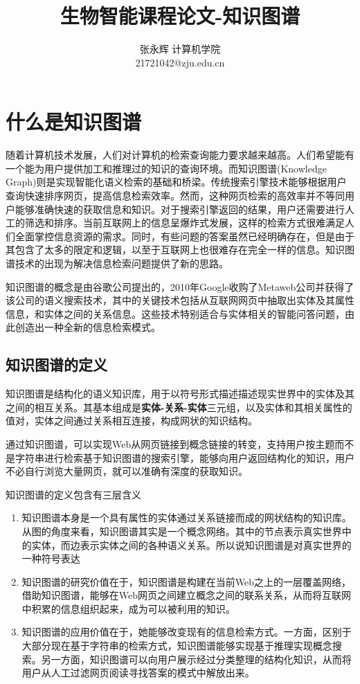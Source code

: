 \documentclass[11pt]{article}
\title{ \textbf{生物智能课程论文-知识图谱} }
\author{
	张永辉  \qquad 计算机学院  \qquad 21721042\\
	21721042@zju.edu.cn
}
\date{ }
\begin{document}
	
	\maketitle
	\section{什么是知识图谱}
	随着计算机技术发展，人们对计算机的检索查询能力要求越来越高。人们希望能有一个能为用户提供加工和推理过的知识的查询环境。而知识图谱(Knowledge Graph)则是实现智能化语义检索的基础和桥梁\cite{Liu2016}。传统搜索引擎技术能够根据用户查询快速排序网页，提高信息检索效率。然而，这种网页检索的高效率并不等同用户能够准确快速的获取信息和知识。对于搜索引擎返回的结果，用户还需要进行人工的筛选和排序。当前互联网上的信息呈爆炸式发展，这样的检索方式很难满足人们全面掌控信息资源的需求。同时，有些问题的答案虽然已经明确存在，但是由于其包含了太多的限定和逻辑，以至于互联网上也很难存在完全一样的信息。知识图谱技术的出现为解决信息检索问题提供了新的思路。

	知识图谱的概念是由谷歌公司提出的，2010年Google收购了Metaweb公司并获得了该公司的语义搜索技术，其中的关键技术包括从互联网网页中抽取出实体及其属性信息，和实体之间的关系信息。这些技术特别适合与实体相关的智能问答问题，由此创造出一种全新的信息检索模式。
	
	\subsection{知识图谱的定义}
	知识图谱是结构化的语义知识库，用于以符号形式描述描述现实世界中的实体及其之间的相互关系。其基本组成是\textbf{实体-关系-实体}三元组，以及实体和其相关属性的值对，实体之间通过关系相互连接，构成网状的知识结构。\cite{Liu2016}
	
	通过知识图谱，可以实现Web从网页链接到概念链接的转变，支持用户按主题而不是字符串进行检索基于知识图谱的搜索引擎，能够向用户返回结构化的知识，用户不必自行浏览大量网页，就可以准确有深度的获取知识。
	
	知识图谱的定义包含有三层含义
	
	\begin{enumerate}
		\item 知识图谱本身是一个具有属性的实体通过关系链接而成的网状结构的知识库。从图的角度来看，知识图谱其实是一个概念网络。其中的节点表示真实世界中的实体，而边表示实体之间的各种语义关系。所以说知识图谱是对真实世界的一种符号表达
		\item 知识图谱的研究价值在于，知识图谱是构建在当前Web之上的一层覆盖网络，借助知识图谱，能够在Web网页之间建立概念之间的联系关系，从而将互联网中积累的信息组织起来，成为可以被利用的知识。
		\item 知识图谱的应用价值在于，她能够改变现有的信息检索方式。一方面，区别于大部分现在基于字符串的检索方式，知识图谱能够实现基于推理实现概念搜索。另一方面，知识图谱可以向用户展示经过分类整理的结构化知识，从而将用户从人工过滤网页阅读寻找答案的模式中解放出来。
	\end{enumerate}
\end{document}
